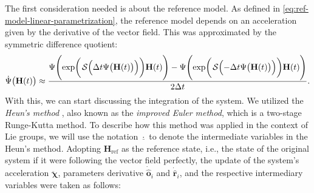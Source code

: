The first consideration needed is about the reference model. As defined in \eqref{eq:ref-model-linear-parametrization}, the reference model depends on an acceleration given by the derivative of the vector field. This was approximated by the symmetric difference quotient:
\begin{align}
    \dot{\Psi}\bigl(\mathbf{H}(t)\bigr) \approx \frac{\Psi\Biggl(\exp\biggl(\SL\Bigl(\Delta t\Psi\bigl(\mathbf{H}(t)\bigr)\Bigr)\biggr)\mathbf{H}(t)\Biggr) - \Psi\Biggl(\exp\biggl(\SL\Bigl(-\Delta t\Psi\bigl(\mathbf{H}(t)\bigr)\Bigr)\biggr)\mathbf{H}(t)\Biggr)}{2\Delta t}. \label{eq:approximation-derivative-psi}
\end{align}
With this, we can start discussing the integration of the system. We utilized the \emph{Heun's method} \citep[p. 330]{fred2007algoritmos}, also known as the \emph{improved Euler method}, which is a two-stage Runge-Kutta method. To describe how this method was applied in the context of Lie groups, we will use the notation $\underline{\cdot}$ to denote the intermediate variables in the Heun's method. Adopting $\mathbf{H}_\text{ref}$ as the reference state, i.e., the state of the original system if it were following the vector field perfectly, the update of the system's acceleration $\ddot{\boldsymbol{\chi}}$, parameters derivative $\dot{\widehat{\mathbf{o}}}_i$ and $\dot{\widehat{\mathbf{r}}}_i$, and the respective intermediary variables were taken as follows:
